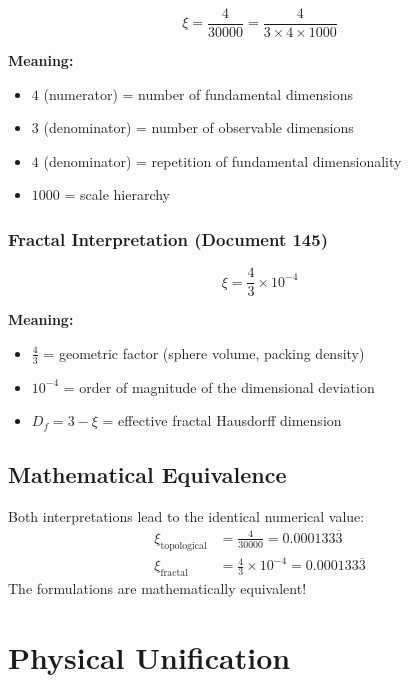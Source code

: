	\begin{equation}
		\xi = \frac{4}{30000} = \frac{4}{3 \times 4 \times 1000}
	\end{equation}
	
	\textbf{Meaning:}
	\begin{itemize}
		\item $4$ (numerator) = number of fundamental dimensions
		\item $3$ (denominator) = number of observable dimensions
		\item $4$ (denominator) = repetition of fundamental dimensionality
		\item $1000$ = scale hierarchy
	\end{itemize}
	
	\subsubsection{Fractal Interpretation (Document 145)}
	
	\begin{equation}
		\xi = \frac{4}{3} \times 10^{-4}
	\end{equation}
	
	\textbf{Meaning:}
	\begin{itemize}
		\item $\frac{4}{3}$ = geometric factor (sphere volume, packing density)
		\item $10^{-4}$ = order of magnitude of the dimensional deviation
		\item $D_f = 3 - \xi$ = effective fractal Hausdorff dimension
	\end{itemize}
	
	\subsection{Mathematical Equivalence}
	
	\begin{important}
		Both interpretations lead to the identical numerical value:
		\begin{align}
			\xi_{\text{topological}} &= \frac{4}{30000} = 0.000133\overline{3} \\
			\xi_{\text{fractal}} &= \frac{4}{3} \times 10^{-4} = 0.000133\overline{3}
		\end{align}
		The formulations are mathematically equivalent!
	\end{important}
	
	\section{Physical Unification}
	
